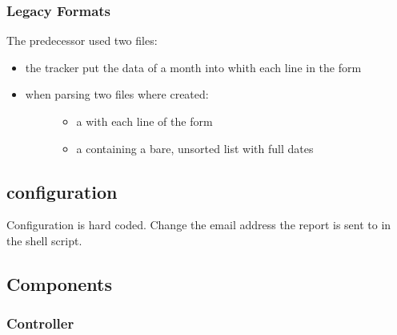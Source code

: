 \documentclass[letterpaper,10pt,english]{sphinxmanual}
\begin{document}
\subsubsection{Legacy Formats}
\label{\detokenize{devmanual:legacy-formats}}
The predecessor  used two files:
\begin{itemize}
\item {} 
the tracker put the data of a month into  whith each line in the form 

\item {} \begin{description}
\item[{when parsing two files where created:}] \leavevmode\begin{itemize}
\item {} 
a  with each line of the form 

\item {} 
a  containing a bare, unsorted list with full dates

\end{itemize}

\end{description}

\end{itemize}


\subsection{configuration}
\label{\detokenize{devmanual:configuration}}
Configuration is hard coded. Change the email address the report is sent to in the shell script.


\subsection{Components}
\label{\detokenize{devmanual:components}}

\subsubsection{Controller}
\label{\detokenize{devmanual:controller}}
\end{document}
